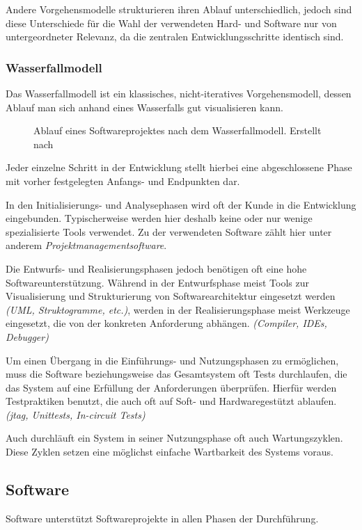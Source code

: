 Andere Vorgehensmodelle strukturieren ihren Ablauf unterschiedlich, jedoch sind
diese Unterschiede für die Wahl der verwendeten Hard- und Software nur von
untergeordneter Relevanz, da die zentralen Entwicklungsschritte
identisch sind.

\subsubsection*{Wasserfallmodell}
Das Wasserfallmodell ist ein klassisches, nicht-iteratives Vorgehensmodell,
dessen Ablauf man sich anhand eines Wasserfalls gut visualisieren kann. 

\begin{figure}[!h]
\centering
\def\svgwidth{\columnwidth}

\caption{Ablauf eines Softwareprojektes nach dem Wasserfallmodell. Erstellt nach
\cite{WP01}}
\end{figure}

Jeder einzelne Schritt in der Entwicklung stellt hierbei eine abgeschlossene
Phase mit vorher festgelegten Anfangs- und Endpunkten dar.

In den Initialisierungs- und Analysephasen wird oft der Kunde in die
Entwicklung eingebunden. Typischerweise werden hier deshalb keine oder nur
wenige spezialisierte Tools verwendet. Zu der verwendeten Software zählt hier
unter anderem \emph{Projektmanagementsoftware}.

Die Entwurfs- und Realisierungsphasen jedoch benötigen oft eine hohe
Softwareunterstützung. Während in der Entwurfsphase meist Tools zur
Visualisierung und Strukturierung von Softwarearchitektur eingesetzt werden
\emph{(UML, Struktogramme, etc.)}, werden in der Realisierungsphase meist
Werkzeuge eingesetzt, die von der konkreten Anforderung abhängen.
\emph{(Compiler, IDEs, Debugger)}

Um einen Übergang in die Einführungs- und Nutzungsphasen zu ermöglichen, muss
die Software beziehungsweise das Gesamtsystem oft Tests durchlaufen, die das
System auf eine Erfüllung der Anforderungen überprüfen. Hierfür werden
Testpraktiken benutzt, die auch oft auf Soft- und Hardwaregestützt ablaufen.
\emph{(\gls{jtag}, Unittests, In-circuit Tests)}

Auch durchläuft ein System in seiner Nutzungsphase oft auch Wartungszyklen.
Diese Zyklen setzen eine möglichst einfache Wartbarkeit des Systems voraus.

\subsection{Software}\label{sub:software}
Software unterstützt Softwareprojekte in allen Phasen der Durchführung.

